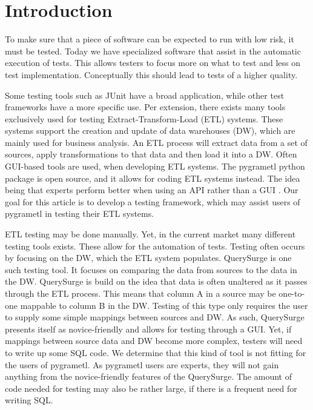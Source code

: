 \section{Introduction} %
To make sure that a piece of software can be expected to run with low risk, it must be tested. Today we have specialized software that assist in the automatic execution of tests. This allows testers to focus more on what to test and less on test implementation. Conceptually this should lead to tests of a higher quality.

Some testing tools such as JUnit have a broad application, while other test frameworks have a more specific use. Per extension, there exists many tools exclusively used for testing Extract-Transform-Load (ETL) systems. These systems support the creation and update of data warehouses (DW), which are mainly used for business analysis. An ETL process will extract data from a set of sources, apply transformations to that data and then load it into a DW. Often GUI-based tools are used, when developing ETL systems. The pygrametl python package is open source, and it allows for coding ETL systems instead. The idea being that experts perform better when using an API rather than a GUI \cite{thomsen2009pygrametl}. Our goal for this article is to develop a testing framework, which may assist users of pygrametl in testing their ETL systems.

ETL testing may be done manually. Yet, in the current market many different testing tools exists. These  allow for the automation of tests. Testing often occurs by focusing on the DW, which the ETL system populates. QuerySurge\cite{QuerySurge} is one such testing tool. It focuses on comparing the data from sources to the data in the DW. QuerySurge is build on  the idea that data is often unaltered as it passes through the ETL process. This means that column A in a source may be one-to-one mappable to column B in the DW. Testing of this type only requires the user to supply some simple mappings between sources and DW. As such, QuerySurge presents itself as novice-friendly and allows for testing through a GUI. Yet, if mappings between source data and DW become more complex, testers will need to write up some SQL code. We determine that this kind of tool is not fitting for the users of pygrametl. As pygrametl users are experts, they will not gain anything from the novice-friendly features of the QuerySurge. The amount of code needed for testing may also be rather large, if there is a frequent need for writing SQL. 

